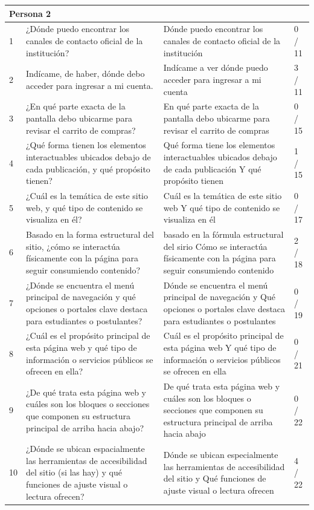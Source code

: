 \begin{longtable}{|p{0.5cm}|p{5.7cm}|p{5.7cm}|p{1.5cm}|}
    \multicolumn{4}{|l|}{\textbf{Persona 2}} \\
    \hline
    1 & ¿Dónde puedo encontrar los canales de contacto oficial de la institución? & Dónde puedo encontrar los canales de contacto oficial de la institución & 0 / 11 \\
    \hline
    2 & Indícame, de haber, dónde debo acceder para ingresar a mi cuenta. & Indícame a ver dónde puedo acceder para ingresar a mi cuenta & 3 / 11 \\
    \hline
    3 & ¿En qué parte exacta de la pantalla debo ubicarme para revisar el carrito de compras? & En qué parte exacta de la pantalla debo ubicarme para revisar el carrito de compras & 0 / 15 \\
    \hline
    4 & ¿Qué forma tienen los elementos interactuables ubicados debajo de cada publicación, y qué propósito tienen? & Qué forma tiene los elementos interactuables ubicados debajo de cada publicación Y qué propósito tienen & 1 / 15 \\
    \hline
    5 & ¿Cuál es la temática de este sitio web, y qué tipo de contenido se visualiza en él? & Cuál es la temática de este sitio web Y qué tipo de contenido se visualiza en él & 0 / 17 \\
    \hline
    6 & Basado en la forma estructural del sitio, ¿cómo se interactúa físicamente con la página para seguir consumiendo contenido? & basado en la fórmula estructural del sirio Cómo se interactúa físicamente con la página para seguir consumiendo contenido & 2 / 18 \\
    \hline
    7 & ¿Dónde se encuentra el menú principal de navegación y qué opciones o portales clave destaca para estudiantes o postulantes? & Dónde se encuentra el menú principal de navegación y Qué opciones o portales clave destaca para estudiantes o postulantes & 0 / 19 \\
    \hline
    8 & ¿Cuál es el propósito principal de esta página web y qué tipo de información o servicios públicos se ofrecen en ella? & Cuál es el propósito principal de esta página web Y qué tipo de información o servicios públicos se ofrecen en ella & 0 / 21 \\
    \hline
    9 & ¿De qué trata esta página web y cuáles son los bloques o secciones que componen su estructura principal de arriba hacia abajo? & De qué trata esta página web y cuáles son los bloques o secciones que componen su estructura principal de arriba hacia abajo & 0 / 22 \\
    \hline
    10 & ¿Dónde se ubican espacialmente las herramientas de accesibilidad del sitio (si las hay) y qué funciones de ajuste visual o lectura ofrecen? & Dónde se ubican especialmente las herramientas de accesibilidad del sitio y Qué funciones de ajuste visual o lectura ofrecen & 4 / 22 \\
    \hline


\end{longtable}
